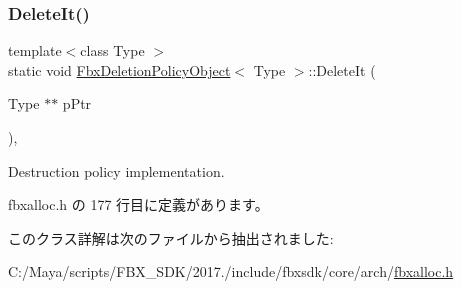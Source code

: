 \subsubsection{\texorpdfstring{Delete\+It()}{DeleteIt()}}
{\footnotesize\ttfamily template$<$class Type $>$ \\
static void \hyperlink{class_fbx_deletion_policy_object}{Fbx\+Deletion\+Policy\+Object}$<$ Type $>$\+::Delete\+It (\begin{DoxyParamCaption}\item[{Type $\ast$$\ast$}]{p\+Ptr }\end{DoxyParamCaption})\hspace{0.3cm}{\ttfamily [inline]}, {\ttfamily [static]}}



Destruction policy implementation. 



 fbxalloc.\+h の 177 行目に定義があります。



このクラス詳解は次のファイルから抽出されました\+:\begin{DoxyCompactItemize}
\item 
C\+:/\+Maya/scripts/\+F\+B\+X\+\_\+\+S\+D\+K/2017./include/fbxsdk/core/arch/\hyperlink{fbxalloc_8h}{fbxalloc.\+h}\end{DoxyCompactItemize}

